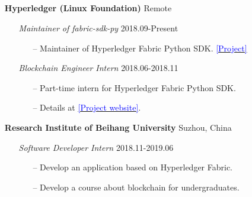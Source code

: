 \documentclass[11pt]{article}
\begin{document}
\subsection*{}
\begin{itemize}[leftmargin=0em]
    \setlength\itemsep{1em}
    \item[] \large\textbf{Hyperledger (Linux Foundation)} \hfill Remote
        \begin{itemize}[noitemsep, nolistsep, leftmargin=0em]
            \item[] \large\emph{Maintainer of fabric-sdk-py} \hfill 2018.09-Present
             \begin{itemize}
                \item[--] Maintainer of Hyperledger Fabric Python SDK. \href{https://github.com/hyperledger/fabric-sdk-py}{\textcolor{blue}{[Project]}}
             \end{itemize}
            \item[] \large\emph{Blockchain Engineer Intern} \hfill 2018.06-2018.11
             \begin{itemize}
                \item[--] Part-time intern for Hyperledger Fabric Python SDK.
                \item[--] Details at \href{https://wiki.hyperledger.org/internship/project_ideas}{\textcolor{blue}{[Project website]}}.
             \end{itemize}
        \end{itemize} 
    \item[] \large\textbf{Research Institute of Beihang University} \hfill Suzhou, China
        \begin{itemize}[noitemsep, nolistsep, leftmargin=0em]
            \item[] \large\emph{Software Developer Intern} \hfill 2018.11-2019.06
             \begin{itemize}
                \item[--] Develop an application based on Hyperledger Fabric.
                \item[--] Develop a course about blockchain for undergraduates.
             \end{itemize}
        \end{itemize} 
\end{itemize}
\end{document}

